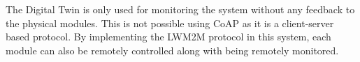 The Digital Twin is only used for monitoring the system without any feedback to the physical modules. This is not possible using \acrshort{CoAP} as it is a client-server based protocol. By implementing the LWM2M protocol in this system, each module can also be remotely controlled along with being remotely monitored.
